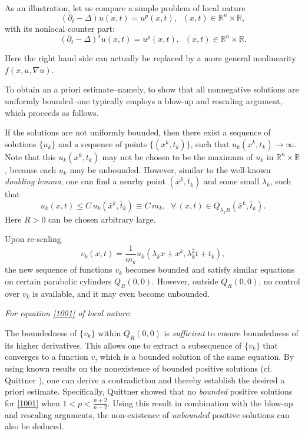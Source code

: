 \documentclass[12pt]{article}
\theoremstyle{remark}
\numberwithin{equation}{section}
\newcommand{\R}{\mathbb{R}}
\begin{document}
As an illustration, let us compare a simple problem of local nature
\begin{equation}
(\partial_t - \Delta) u(x,t) = u^p(x,t), \;\; (x,t) \in \R^n \times \R,
\label{1001}
\end{equation}
with its nonlocal counter part:
\begin{equation}
(\partial_t - \Delta)^s u(x,t) = u^p(x,t), \;\; (x,t) \in \R^n \times \R.
\label{1002}
\end{equation}

Here the right hand side can actually be replaced by a more general nonlinearity $f(x, u, \nabla u)$.


To obtain an a priori estimate--namely, to show that all nonnegative solutions are uniformly bounded--one typically employs a blow-up and rescaling argument, which proceeds as follows.

If the solutions are not uniformly bounded, then there exist a sequence of solutions $\{u_k\}$ and a sequence of points $\{(x^k, t_k)\}$,
such that $u_k(x^k, t_k) \to \infty$. Note that this $u_k(x^k,t_k)$ may not be chosen to be the maximum of $u_k$ in $\R^n \times \R$, because each $u_k$ may be unbounded. However, similar to the well-known {\em doubling lemma}, one can find a nearby point $(\bar{x}^k, \bar{t}_k)$ and some small $\lambda_k$, such that
$$ u_k(x,t) \leq C \, u_k (\bar{x}^k, \bar{t}_k) \equiv C \, m_k, \;\; \forall \, (x,t) \in Q_{\lambda_k R} (\bar{x}^k, \bar{t}_k).$$
Here $R>0$ can be chosen arbitrary large.

Upon re-scaling
$$ v_k (x,t) = \frac{1}{m_k} u_k (\lambda_k x + x^k, \lambda^2_k t + t_k),$$
the new sequence of functions $v_k$ becomes bounded and satisfy similar equations on certain parabolic cylinders $Q_R (0,0)$. However, outside $Q_R(0,0)$, no control over $v_k$ is available, and it may even become unbounded.

{\em For equation \eqref{1001} of local nature}:

The boundedness of $\{v_k\}$ within $Q_R(0,0)$  is  {\em sufficient} to ensure boundedness of its higher derivatives. This allows one to extract a subsequence of  $\{v_k\}$ that converges to a function $v$, which is a bounded solution of the same equation. By using known results on the nonexistence of bounded positive solutions (cf. Quittner \cite{Q}), one can derive a contradiction and thereby establish  the desired a priori estimate. Specifically, Quittner showed that no {\em bounded} positive solutions for \eqref{1001} when $1<p< \frac{n+2}{n-2}$. Using  this result in combination with the blow-up and rescaling arguments, the non-existence of {\em unbounded} positive solutions can also be deduced.
\end{document}
